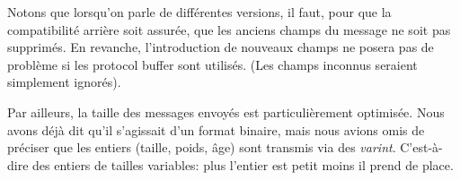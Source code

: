 Notons que lorsqu'on parle de différentes versions, il faut, pour que la compatibilité arrière soit assurée, que les anciens
champs du message ne soit pas supprimés. En revanche, l'introduction de nouveaux champs ne posera pas de problème si les protocol
buffer sont utilisés. (Les champs inconnus seraient simplement ignorés).
\newline

Par ailleurs, la taille des messages envoyés est particulièrement optimisée. Nous avons déjà dit qu'il s'agissait d'un format
binaire, mais nous avions omis de préciser que les entiers (taille, poids, âge) sont transmis via des \textit{varint}.
C'est-à-dire des entiers de tailles variables: plus l'entier est petit moins il prend de place.
